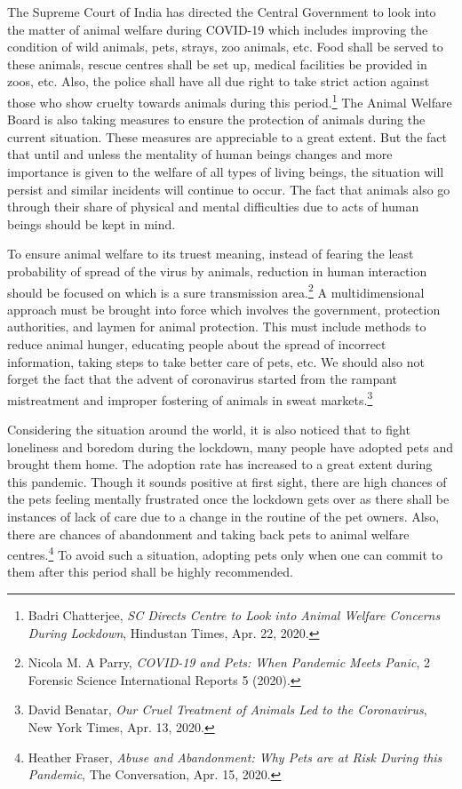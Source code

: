 \begin{multicols}{2}
\noi
The Supreme Court of India has directed the Central Government to look into the matter of
animal welfare during COVID-19 which includes improving the condition of wild animals,
pets, strays, zoo animals, etc. Food shall be served to these animals, rescue centres shall be
set up, medical facilities be provided in zoos, etc. Also, the police shall have all due right to
take strict action against those who show cruelty towards animals during this period.\footnote{Badri Chatterjee, \textit{SC Directs Centre to Look into Animal Welfare Concerns During Lockdown}, Hindustan Times, Apr. 22, 2020.} The
Animal Welfare Board is also taking measures to ensure the protection of animals during the
current situation. These measures are appreciable to a great extent. But the fact that until and
unless the mentality of human beings changes and more importance is given to the welfare of
all types of living beings, the situation will persist and similar incidents will continue to
occur. The fact that animals also go through their share of physical and mental difficulties
due to acts of human beings should be kept in mind.

\noi
To ensure animal welfare to its truest meaning, instead of fearing the least probability of
spread of the virus by animals, reduction in human interaction should be focused on which is
a sure transmission area.\footnote{Nicola M. A Parry, \textit{COVID-19 and Pets: When Pandemic Meets Panic}, 2 Forensic Science International
Reports 5 (2020).} A multidimensional approach must be brought into force which
involves the government, protection authorities, and laymen for animal protection. This must
include methods to reduce animal hunger, educating people about the spread of incorrect
information, taking steps to take better care of pets, etc. We should also not forget the fact
that the advent of coronavirus started from the rampant mistreatment and improper fostering
of animals in sweat markets.\footnote{David Benatar, \textit{Our Cruel Treatment of Animals Led to the Coronavirus}, New York Times, Apr. 13, 2020.}

\noi
Considering the situation around the world, it is also noticed that to fight loneliness and
boredom during the lockdown, many people have adopted pets and brought them home. The
adoption rate has increased to a great extent during this pandemic. Though it sounds positive at first sight, there are high chances of the pets feeling mentally frustrated once the lockdown
gets over as there shall be instances of lack of care due to a change in the routine of the pet
owners. Also, there are chances of abandonment and taking back pets to animal welfare
centres.\footnote{Heather Fraser, \textit{Abuse and Abandonment: Why Pets are at Risk During this Pandemic}, The Conversation, Apr.
15, 2020.} To avoid such a situation, adopting pets only when one can commit to them after
this period shall be highly recommended.


\end{multicols}
